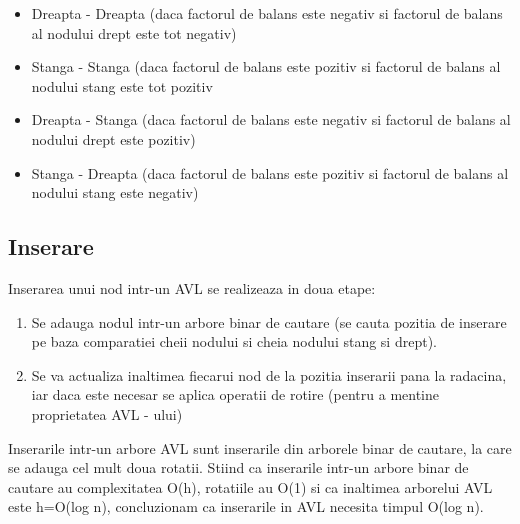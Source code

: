 \documentclass[12pt]{article}
\begin{document}
\begin{itemize}
  \item Dreapta - Dreapta (daca factorul de balans este negativ si factorul de balans al nodului drept este tot negativ)
\end{itemize}
\noindent{}
\newpage
\begin{itemize}

  \item Stanga - Stanga (daca factorul de balans este pozitiv si factorul de balans al nodului stang este tot pozitiv
\end{itemize}
\noindent{}
\begin{itemize}
  \item Dreapta - Stanga (daca factorul de balans este negativ si factorul de balans al nodului drept este pozitiv)
\end{itemize}
\noindent{}
\begin{itemize}
  \item Stanga - Dreapta (daca factorul de balans este pozitiv si factorul de balans al nodului stang este negativ)
\end{itemize}
\noindent{}


\newpage
\subsection{Inserare}
Inserarea unui nod intr-un AVL se realizeaza in doua etape:
\begin{enumerate}
\item Se adauga nodul intr-un arbore binar de cautare (se cauta pozitia de inserare pe baza comparatiei cheii nodului si cheia nodului stang si drept).
\item Se va actualiza inaltimea fiecarui nod de la pozitia inserarii pana la radacina, iar daca este necesar se aplica operatii de rotire (pentru a mentine proprietatea AVL - ului)
\end{enumerate}
Inserarile intr-un arbore AVL sunt inserarile din arborele binar de cautare, la care se adauga cel mult doua rotatii.
Stiind ca inserarile intr-un arbore binar de cautare au complexitatea O(h), rotatiile au O(1) si ca inaltimea arborelui AVL este h=O(log n), concluzionam ca inserarile in AVL necesita timpul O(log n).
\end{document}
